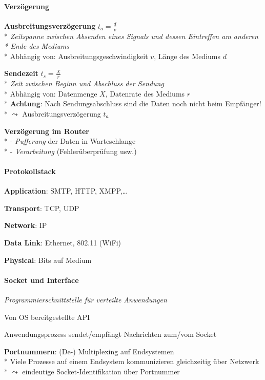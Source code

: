 \paragraph{Verzögerung}
\begin{items}
  \item \textbf{Ausbreitungsverzögerung} \( t_a = \tfrac{d}{v} \) \\*
    \emph{Zeitspanne zwischen Absenden eines Signals und dessen Eintreffen am anderen \\* \phantom{-} Ende des Mediums} \\*
    Abhängig von: Ausbreitungsgeschwindigkeit \( v \), Länge des Mediums \( d \)
  \item \textbf{Sendezeit} \( t_s = \tfrac{X}{r} \) \\*
    \emph{Zeit zwischen Beginn und Abschluss der Sendung} \\*
    Abhängig von: Datenmenge \( X \), Datenrate des Mediums \( r \) \\*
    \textbf{Achtung}: Nach Sendungsabschluss sind die Daten noch nicht beim Empfänger! \\* \phantom{-} \( \leadsto \) Ausbreitungsverzögerung \( t_a \)
  \item \textbf{Verzögerung im Router} \\*
    - \emph{Pufferung} der Daten in Warteschlange \\*
    - \emph{Verarbeitung} (Fehlerüberprüfung usw.)
\end{items}

\paragraph{Protokollstack}
\begin{items}
  \item \textbf{Application}: SMTP, HTTP, XMPP,\dots
  \item \textbf{Transport}: TCP, UDP
  \item \textbf{Network}: IP
  \item \textbf{Data Link}: Ethernet, 802.11 (WiFi)
  \item \textbf{Physical}: Bits auf Medium
\end{items}

\paragraph{Socket und Interface}
\begin{items}
  \item \emph{Programmierschnittstelle für verteilte Anwendungen}
  \item Von OS bereitgestellte API
  \item Anwendungsprozess sendet/empfängt Nachrichten zum/vom Socket
  \item \textbf{Portnummern}: (De-) Multiplexing auf Endsystemen \\*
    Viele Prozesse auf einem Endsystem kommunizieren gleichzeitig über Netzwerk \\*
    \phantom{-} \( \leadsto \) eindeutige Socket-Identifikation über Portnummer
\end{items}

